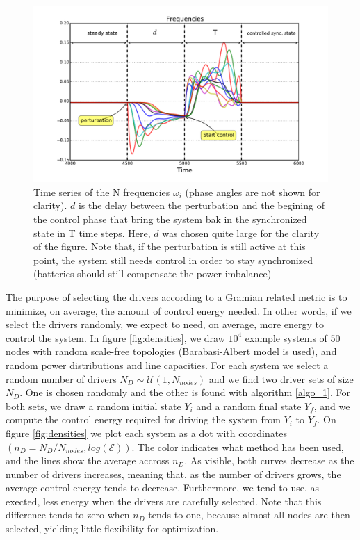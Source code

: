 \documentclass[conference]{IEEEtran}
\begin{document}
\begin{figure}
\includegraphics[scale=.38]{./figure_2/figure_2.pdf}
\caption{Time series of the N frequencies $\omega_i$ (phase angles are not shown for clarity). $d$ is the delay between the perturbation and the begining of the control phase that bring the system bak in the synchronized state in T time steps. Here, $d$ was chosen quite large for the clarity of the figure. Note that, if the perturbation is still active at this point, the system still needs control in order to stay synchronized (batteries should still compensate the power imbalance)}
\label{fig:frequecies}
\end{figure}

The purpose of selecting the drivers according to a Gramian related metric is to minimize, on average, the amount of control energy needed. In other words, if we select the drivers randomly, we expect to need, on average, more energy to control the system. In figure \ref{fig:densities}, we draw $10^4$ example systems of 50 nodes with random scale-free topologies (Barabasi-Albert model is used), and random power distributions and line capacities.  For each system we select a random number of drivers $N_D \sim \mathcal{U}(1,N_{nodes}) $ and we find two driver sets of size $N_D $. One is chosen randomly and the other is found with algorithm \ref{algo_1}. For both sets, we draw a random initial state $Y_i$ and a random final state $Y_f$, and we compute the control energy required for driving the system from $Y_i$ to $Y_f$. On figure \ref{fig:densities} we plot each system as a dot with coordinates $(n_D = N_D / N_{nodes}, log(\mathcal{E}))$. The color indicates what method has been used, and the lines show the average accross $n_D$. As visible, both curves decrease as the number of drivers increases, meaning that, as the number of drivers grows, the average control energy tends to decrease. Furthermore, we tend to use, as exected, less energy when the drivers are carefully selected. Note that this difference tends to zero when $n_D$ tends to one, because almost all nodes are then selected, yielding little flexibility for optimization.
\end{document}
